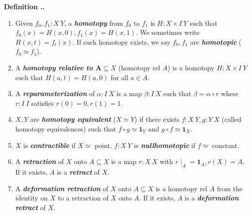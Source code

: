 \documentclass{natsirt}
\renewcommand{\emph}[1]{\textbf{\textit{#1}}}
\newcounter{def}[section]
\newenvironment{defbox}[1][]{
\begin{bluebox}[#1]\refstepcounter{def}\textbf{Definition \thesection.\thedef. }}{\end{bluebox}}
\begin{document}
\begin{defbox}
    \begin{enumerate}
        \item Given $f_0,f_1: X\> Y$, a \emph{homotopy} from $f_0$ to $f_1$ is $H:X\times I \> Y$ such that $f_0(x) = H(x,0), f_1(x) = H(x,1)$. We sometimes write $H(x,t) = f_t(x)$. If such homotopy exists, we say $f_0,f_1$ are \emph{homotopic} ($f_0\simeq f_1$).
        \item A \emph{homotopy relative to $\pmb{A}\subseteq X$} (homotopy rel $A$) is a homotopy $H:X\times I \> Y$ such that $H(a,t)=H(a,0)$ for all $a\in A$.
        \item A \emph{reparameterization} of $\alpha: I \> X$ is a map $\beta: I\> X$ such that $\beta = \alpha \circ r$ where $r:I\> I$ satisfies $r(0)=0, r(1)=1$.
        \item $X,Y$ are \emph{homotopy equivalent} ($X\simeq Y$) if there exists $f:X\>Y, g:Y\>X$ (called homotopy equivalences) such that $f\circ g \simeq \textbf{1}_Y$ and $g\circ f \simeq \textbf{1}_X$.
        \item $X$ is \emph{contractible} if $X\simeq $ point. $f:X\>Y$ is \emph{nullhomotopic} if $f\simeq$ constant.
        \item A \emph{retraction} of $X$ onto $A\subseteq X$ is a map $r:X\>X$ with $r\mid_A = \textbf{1}_A, r(X) = A$. If it exists, $A$ is a \emph{retract} of $X$.
        \item A \emph{deformation retraction} of $X$ onto $A\subseteq X$ is a homotopy rel $A$ from the identity on $X$ to a retraction of $X$ onto $A$. If it exists, $A$ is a \emph{deformation retract} of $X$.
    \end{enumerate}
    
\end{defbox}
\end{document}
